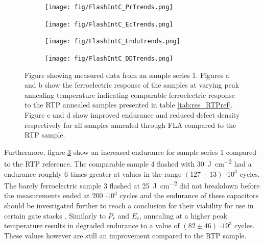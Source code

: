 \documentclass[11pt,twoside]{eitExjobb}
\begin{document}
\begin{figure}[htbp]
    \centering
    \begin{subfigure}{.4\linewidth}
        \texttt{[image: fig/FlashIntC\_PrTrends.png]}
        \caption{}\label{fig:res_IntCPr}
    \end{subfigure}
    \begin{subfigure}{.4\linewidth}
        \texttt{[image: fig/FlashIntC\_EcTrends.png]}
        \caption{}\label{fig:res_IntCEc}
    \end{subfigure}
    \begin{subfigure}{.4\linewidth}
        \texttt{[image: fig/FlashIntC\_EnduTrends.png]}
        \caption{}\label{fig:res_IntCEndu}
    \end{subfigure}
    \begin{subfigure}{.4\linewidth}
        \texttt{[image: fig/FlashIntC\_DDTrends.png]}
        \caption{}\label{fig:res_IntCDD}
    \end{subfigure}
    \caption{Figure showing measured data from an sample series 1. Figures a and
        b show the ferroelectric response of the samples at varying peak
        annealing temperature indicating comparable ferroelectric response to
        the RTP annealed samples presented in table \ref{tab:res_RTPref}.
        Figure c and d show improved endurance and reduced defect density
        respectively for all samples annealed through FLA compared to the RTP
        sample.}\label{fig:res_IntC}
\end{figure}

Furthermore, figure \ref{fig:res_IntCEndu} show an increased endurance for
sample series 1 compared to the RTP reference. The comparable sample 4 flashed
with \SI{30}{\joule\per\centi\meter\squared} had a endurance roughly 6 times
greater at values in the range $(127 \pm 13)$ $\cdot 10^3$ cycles. The barely
ferroelectric sample 3 flashed at \SI{25}{\joule\per\centi\meter\squared}
did not breakdown before the measurements ended at $200$ $\cdot 10^3$ cycles and
the endurance of these capacitors should be investigated further to reach a
conclusion for their viability for use in certain gate stacks \cite{dawber2005physics}.
Similarly to $P_r$ and $E_c$, annealing at a higher peak temperature results in degraded
endurance to a value of $(82 \pm 46)$ $\cdot 10^3$ cycles. These values however
are still an improvement compared to the RTP sample.
\end{document}
